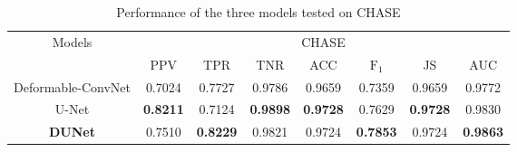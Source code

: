 \documentclass[journal]{IEEEtran}
\begin{document}
\begin{table}[]
\caption{Performance of the three models tested on CHASE}
\renewcommand\arraystretch{1.3}      
\renewcommand\tabcolsep{1.5pt} 
\begin{center}
\begin{tabular}{cccccccc}
\toprule
\multirow{2}{*}{Models} & \multicolumn{7}{c}{CHASE}                                                                                                  \\ \cline{2-8} 
                        & PPV             & TPR             & TNR             & ACC             & $\mathrm{F_{1}}$              & JS              & AUC             \\ \hline
Deformable-ConvNet      & 0.7024         & 0.7727          & 0.9786          & 0.9659          &  0.7359          & 0.9659         & 0.9772          \\ 
U-Net                   & \textbf{0.8211} &  0.7124         & \textbf{0.9898} &\textbf{0.9728}          &  0.7629           & \textbf{0.9728}          & 0.9830          \\
\textbf{DUNet}                   & 0.7510         & \textbf{0.8229} & 0.9821          & 0.9724 & \textbf{0.7853} & 0.9724 & \textbf{0.9863} \\
\bottomrule
\end{tabular}
\end{center}
\label{table:CHASE_performance}
\end{table}
\end{document}
